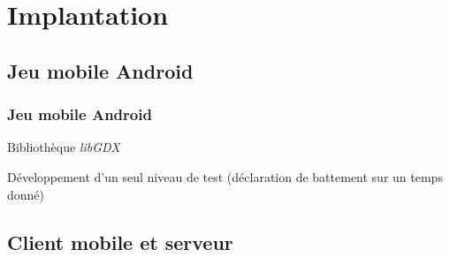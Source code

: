 \section{Implantation}

\subsection{Jeu mobile Android}
\begin{frame}
\frametitle{Jeu mobile Android}
\begin{center}
Bibliothèque \textit{libGDX}

Développement d'un seul niveau de test (déclaration de battement sur un temps donné)
\end{center}
\end{frame}

\subsection{Client mobile et serveur}
